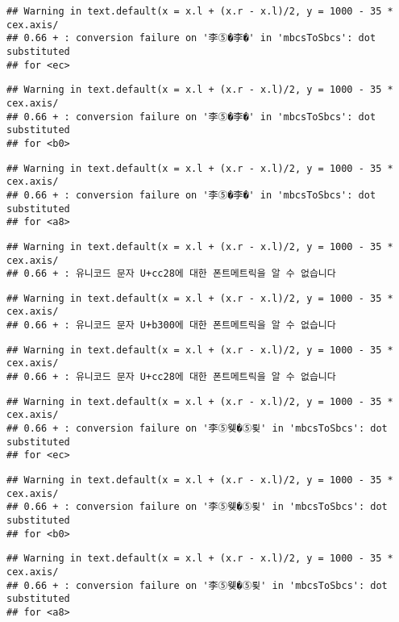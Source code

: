 \documentclass[]{article}
\begin{document}
\begin{verbatim}
## Warning in text.default(x = x.l + (x.r - x.l)/2, y = 1000 - 35 * cex.axis/
## 0.66 + : conversion failure on '李⑤�李�' in 'mbcsToSbcs': dot substituted
## for <ec>
\end{verbatim}

\begin{verbatim}
## Warning in text.default(x = x.l + (x.r - x.l)/2, y = 1000 - 35 * cex.axis/
## 0.66 + : conversion failure on '李⑤�李�' in 'mbcsToSbcs': dot substituted
## for <b0>
\end{verbatim}

\begin{verbatim}
## Warning in text.default(x = x.l + (x.r - x.l)/2, y = 1000 - 35 * cex.axis/
## 0.66 + : conversion failure on '李⑤�李�' in 'mbcsToSbcs': dot substituted
## for <a8>
\end{verbatim}

\begin{verbatim}
## Warning in text.default(x = x.l + (x.r - x.l)/2, y = 1000 - 35 * cex.axis/
## 0.66 + : 유니코드 문자 U+cc28에 대한 폰트메트릭을 알 수 없습니다
\end{verbatim}

\begin{verbatim}
## Warning in text.default(x = x.l + (x.r - x.l)/2, y = 1000 - 35 * cex.axis/
## 0.66 + : 유니코드 문자 U+b300에 대한 폰트메트릭을 알 수 없습니다
\end{verbatim}

\begin{verbatim}
## Warning in text.default(x = x.l + (x.r - x.l)/2, y = 1000 - 35 * cex.axis/
## 0.66 + : 유니코드 문자 U+cc28에 대한 폰트메트릭을 알 수 없습니다
\end{verbatim}

\begin{verbatim}
## Warning in text.default(x = x.l + (x.r - x.l)/2, y = 1000 - 35 * cex.axis/
## 0.66 + : conversion failure on '李⑤웾�⑤룆' in 'mbcsToSbcs': dot substituted
## for <ec>
\end{verbatim}

\begin{verbatim}
## Warning in text.default(x = x.l + (x.r - x.l)/2, y = 1000 - 35 * cex.axis/
## 0.66 + : conversion failure on '李⑤웾�⑤룆' in 'mbcsToSbcs': dot substituted
## for <b0>
\end{verbatim}

\begin{verbatim}
## Warning in text.default(x = x.l + (x.r - x.l)/2, y = 1000 - 35 * cex.axis/
## 0.66 + : conversion failure on '李⑤웾�⑤룆' in 'mbcsToSbcs': dot substituted
## for <a8>
\end{verbatim}
\end{document}
